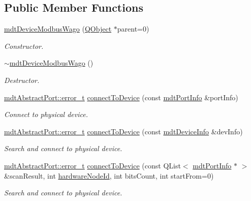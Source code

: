 \subsection*{Public Member Functions}
\begin{DoxyCompactItemize}
\item 
\hyperlink{classmdt_device_modbus_wago_a31abb03678a8afe2e6bf7c03e5e92726}{mdt\-Device\-Modbus\-Wago} (\hyperlink{class_q_object}{Q\-Object} $\ast$parent=0)
\begin{DoxyCompactList}\small\item\em Constructor. \end{DoxyCompactList}\item 
\hyperlink{classmdt_device_modbus_wago_a8a13bfe3028d8c286d4233ea0ce0b2a8}{$\sim$mdt\-Device\-Modbus\-Wago} ()
\begin{DoxyCompactList}\small\item\em Destructor. \end{DoxyCompactList}\item 
\hyperlink{classmdt_abstract_port_ad4121bb930c95887e77f8bafa065a85e}{mdt\-Abstract\-Port\-::error\-\_\-t} \hyperlink{classmdt_device_modbus_wago_ac15c95cee8dec98609278d0e0ab2b3ce}{connect\-To\-Device} (const \hyperlink{classmdt_port_info}{mdt\-Port\-Info} \&port\-Info)
\begin{DoxyCompactList}\small\item\em Connect to physical device. \end{DoxyCompactList}\item 
\hyperlink{classmdt_abstract_port_ad4121bb930c95887e77f8bafa065a85e}{mdt\-Abstract\-Port\-::error\-\_\-t} \hyperlink{classmdt_device_modbus_wago_a025f0411a708a529054a0e3c0b6461cd}{connect\-To\-Device} (const \hyperlink{classmdt_device_info}{mdt\-Device\-Info} \&dev\-Info)
\begin{DoxyCompactList}\small\item\em Search and connect to physical device. \end{DoxyCompactList}\item 
\hyperlink{classmdt_abstract_port_ad4121bb930c95887e77f8bafa065a85e}{mdt\-Abstract\-Port\-::error\-\_\-t} \hyperlink{classmdt_device_modbus_wago_a12ad1f1ef34b16be5903d1d6232a7c6d}{connect\-To\-Device} (const Q\-List$<$ \hyperlink{classmdt_port_info}{mdt\-Port\-Info} $\ast$ $>$ \&scan\-Result, int \hyperlink{classmdt_device_modbus_ab5e3f041a24d895dbe739a9229d4fd27}{hardware\-Node\-Id}, int bits\-Count, int start\-From=0)
\begin{DoxyCompactList}\small\item\em Search and connect to physical device. \end{DoxyCompactList}\item 

\end{DoxyCompactItemize}
